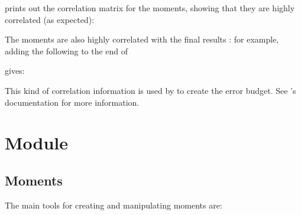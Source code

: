 \documentclass[letterpaper,10pt,english]{sphinxmanual}
\begin{document}
prints out the correlation matrix for the moments, showing that they
are highly correlated (as expected):

\begin{sphinxVerbatim}[commandchars=\\\{\}]
\PYG{p}{[}\PYG{p}{[}                \PYG{p}{]}
 \PYG{p}{[}               \PYG{p}{]}
 \PYG{p}{[}                \PYG{p}{]}
 \PYG{p}{[}               \PYG{p}{]}\PYG{p}{]}
\end{sphinxVerbatim}

The moments are also highly correlated with the final results : for
example, adding the following to the end of 

\begin{sphinxVerbatim}[commandchars=\\\{\}]
\PYG{p}{[} \PYG{p}{[}\PYG{p}{]}\PYG{p}{]}
\end{sphinxVerbatim}

gives:

\begin{sphinxVerbatim}[commandchars=\\\{\}]
\PYG{p}{[}\PYG{p}{[}           \PYG{p}{]}
 \PYG{p}{[}           \PYG{p}{]}\PYG{p}{]}
\end{sphinxVerbatim}

This kind of correlation information is used by 
to create the error budget. See ’s documentation
for more information.


\chapter{ Module}
\label{\detokenize{g2tools:g2tools-module}}\label{\detokenize{g2tools::doc}}\label{\detokenize{g2tools:module-g2tools}}

\section{Moments}
\label{\detokenize{g2tools:moments}}
The main tools for creating and manipulating moments are:
\end{document}
